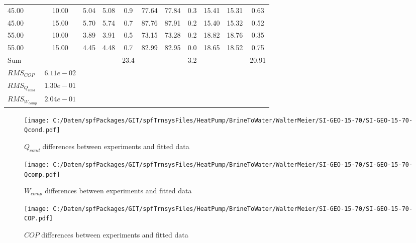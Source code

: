 \documentclass[english]{SPFShortReport}
\begin{document}
\begin{table}[!ht]
\begin{small}
\begin{center}
{\begin{tabular}{l | c c c c c c c c c c }
45.00  & 10.00 & 5.04 & 5.08 & 0.9 & 77.64 & 77.84 & 0.3 & 15.41 & 15.31 & 0.63\\ 
45.00  & 15.00 & 5.70 & 5.74 & 0.7 & 87.76 & 87.91 & 0.2 & 15.40 & 15.32 & 0.52\\ 
55.00  & 10.00 & 3.89 & 3.91 & 0.5 & 73.15 & 73.28 & 0.2 & 18.82 & 18.76 & 0.35\\ 
55.00  & 15.00 & 4.45 & 4.48 & 0.7 & 82.99 & 82.95 & 0.0 & 18.65 & 18.52 & 0.75\\ 
\hline 
 Sum &  & &  & 23.4 &  &  & 3.2 & &  & 20.91\\ 
\hline 
 $RMS_{COP}$ & $6.11e-02$ \\ 
 $RMS_{Q_{cond}}$ & $1.30e-01$ \\ 
 $RMS_{W_{comp}}$ & $2.04e-01$ \\ 
\hline
\hline
\end{tabular}
}
\label{ErrorsTable}
\end{center}
\end{small}
\end{table}
\begin{figure}[!ht]
\begin{center}
\texttt{[image: C:/Daten/spfPackages/GIT/spfTrnsysFiles/HeatPump/BrineToWater/WalterMeier/SI-GEO-15-70/SI-GEO-15-70-Qcond.pdf]}
\caption{$Q_{cond}$ differences between experiments and fitted data}
\label{QcongFig}
\end{center}
\end{figure}
\begin{figure}[!ht]
\begin{center}
\texttt{[image: C:/Daten/spfPackages/GIT/spfTrnsysFiles/HeatPump/BrineToWater/WalterMeier/SI-GEO-15-70/SI-GEO-15-70-Qcomp.pdf]}
\caption{$W_{comp}$ differences between experiments and fitted data}
\label{QcompFig}
\end{center}
\end{figure}
\begin{figure}[!ht]
\begin{center}
\texttt{[image: C:/Daten/spfPackages/GIT/spfTrnsysFiles/HeatPump/BrineToWater/WalterMeier/SI-GEO-15-70/SI-GEO-15-70-COP.pdf]}
\caption{$COP$ differences between experiments and fitted data}
\label{COPFig}
\end{center}
\end{figure}
\end{document}
